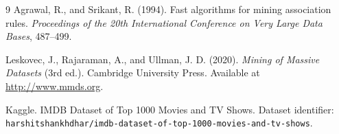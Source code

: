 \documentclass[11pt,a4paper]{article}
\begin{document}
\newpage
\begin{thebibliography}{9}
Agrawal, R., and Srikant, R. (1994). Fast algorithms for mining association rules. \textit{Proceedings of the 20th International Conference on Very Large Data Bases}, 487--499.

Leskovec, J., Rajaraman, A., and Ullman, J. D. (2020). \textit{Mining of Massive Datasets} (3rd ed.). Cambridge University Press. Available at \url{http://www.mmds.org}.

Kaggle. IMDB Dataset of Top 1000 Movies and TV Shows. Dataset identifier: \texttt{harshitshankhdhar/imdb-dataset-of-top-1000-movies-and-tv-shows}.
\end{thebibliography}
\end{document}
